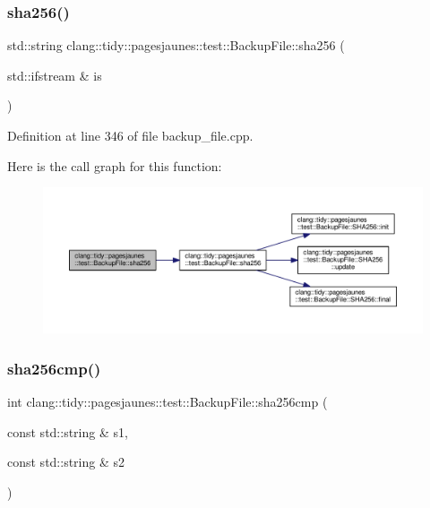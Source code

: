 \subsubsection{\texorpdfstring{sha256()}{sha256()}\hspace{0.1cm}{\footnotesize\ttfamily [2/2]}}
{\footnotesize\ttfamily std\+::string clang\+::tidy\+::pagesjaunes\+::test\+::\+Backup\+File\+::sha256 (\begin{DoxyParamCaption}\item[{std\+::ifstream \&}]{is }\end{DoxyParamCaption})}



Definition at line 346 of file backup\+\_\+file.\+cpp.

Here is the call graph for this function\+:
\nopagebreak
\begin{figure}[H]
\begin{center}
\leavevmode
\includegraphics[width=350pt]{classclang_1_1tidy_1_1pagesjaunes_1_1test_1_1_backup_file_a886904478367718ab3cda84138a64a68_cgraph}
\end{center}
\end{figure}
\mbox{\label{classclang_1_1tidy_1_1pagesjaunes_1_1test_1_1_backup_file_a68a79fc23d88b23608886199fc3b8673}} 
\subsubsection{\texorpdfstring{sha256cmp()}{sha256cmp()}\hspace{0.1cm}{\footnotesize\ttfamily [1/2]}}
{\footnotesize\ttfamily int clang\+::tidy\+::pagesjaunes\+::test\+::\+Backup\+File\+::sha256cmp (\begin{DoxyParamCaption}\item[{const std\+::string \&}]{s1,  }\item[{const std\+::string \&}]{s2 }\end{DoxyParamCaption})}



